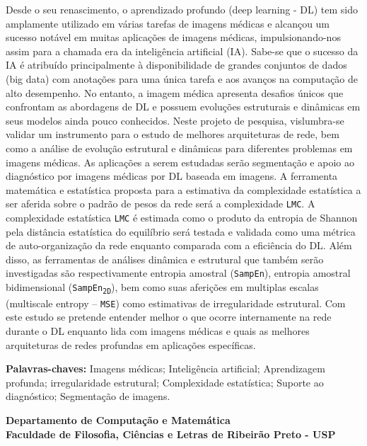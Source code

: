 \documentclass[
	12pt,				%
	openany,oneside,
	a4paper,			%
	english,			%
	brazil,				%
	]{abntex2}
\begin{document}
\setlength{\absparsep}{12pt} %
\begin{resumo}
Desde o seu renascimento, o aprendizado profundo (deep learning - DL) tem sido amplamente utilizado em várias tarefas de imagens médicas e alcançou um sucesso notável em muitas aplicações de imagens médicas, impulsionando-nos assim para a chamada era da inteligência artificial (IA). 
Sabe-se que o sucesso da IA é atribuído principalmente à disponibilidade de grandes conjuntos de dados (big data) com anotações para uma única tarefa e aos avanços na computação de alto desempenho. No entanto, a imagem médica apresenta desafios únicos que confrontam as abordagens de DL e possuem evoluções estruturais e dinâmicas em seus modelos ainda pouco conhecidos. 
Neste projeto de pesquisa, vislumbra-se validar um instrumento para o estudo de melhores arquiteturas de rede, bem como a análise de evolução estrutural e dinâmicas para diferentes problemas em imagens médicas. As aplicações a serem estudadas serão segmentação e apoio ao diagnóstico por imagens médicas por DL baseada em imagens. A ferramenta matemática e estatística proposta para a estimativa da complexidade estatística a ser aferida sobre o padrão de pesos da rede será a complexidade \texttt{LMC}. A complexidade estatística \texttt{LMC} é estimada como o produto da entropia de Shannon pela distância estatística do equilíbrio será testada e validada como uma métrica de auto-organização da rede enquanto comparada com a eficiência do DL. Além disso, as ferramentas de análises dinâmica e estrutural que também serão investigadas são respectivamente entropia amostral (\texttt{SampEn}), entropia amostral bidimensional (\texttt{SampEn\textsubscript{2D}}), bem como suas aferições em multiplas escalas (multiscale entropy – \texttt{MSE}) como estimativas de irregularidade estrutural. Com este estudo se pretende entender melhor o que ocorre internamente na rede durante o DL enquanto lida com imagens médicas e quais as melhores arquiteturas de redes profundas em aplicações específicas.

\textbf{Palavras-chaves:} Imagens médicas; Inteligência artificial; Aprendizagem profunda; irregularidade estrutural; Complexidade estatística; Suporte ao diagnóstico; Segmentação de imagens.

\textbf{\centering\large Departamento de Computação e Matemática\\
					Faculdade de Filosofia, Ciências e Letras de Ribeirão Preto - USP}

\end{resumo}
\end{document}
